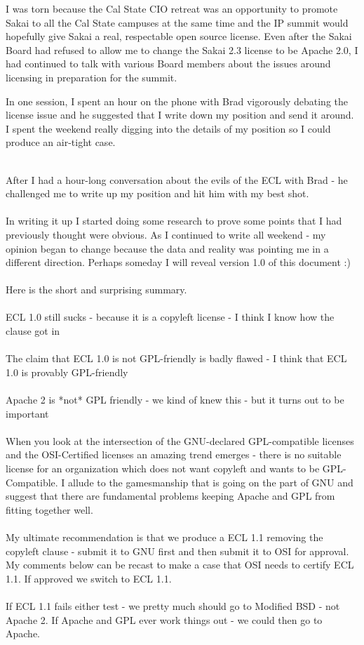 \documentclass[12pt]{book}
\begin{document}
I was torn because the Cal State CIO retreat was an opportunity
to promote Sakai to all the Cal State campuses at the same
time and the IP summit would hopefully give Sakai a real,
respectable open source license.  Even after the Sakai
Board had refused to allow me to change the Sakai 2.3
license to be Apache 2.0, I had continued to talk with
various Board members about the issues around licensing
in preparation for the summit.

In one session, I spent an hour on the phone
with Brad vigorously debating the license issue
and he suggested that I write down my position and
send it around.  I spent the weekend really digging
into the details of my position so I could
produce an air-tight case.\\
\\
\begin{sf}
After I had a hour-long conversation about the evils
of the ECL with Brad - he challenged me to write up
my position and hit him with my best shot.\\
\\
In writing it up I started doing some research to
prove some points that I had previously thought were
obvious.  As I continued to write all weekend - my opinion
began to change because the data and reality was pointing me
in a different direction.  Perhaps someday I will reveal
version 1.0 of this document :)\\
\\
Here is the short and surprising summary.\\
\\
ECL 1.0 still sucks - because it is a copyleft license -
I think I know how the clause got in\\
\\
The claim that ECL 1.0 is not GPL-friendly is badly
flawed - I think that ECL 1.0 is provably GPL-friendly\\
\\
Apache 2 is *not* GPL friendly - we kind of knew this -
but it turns out to be important\\
\\
When you look at the intersection of the GNU-declared
GPL-compatible licenses and the OSI-Certified licenses
an amazing trend emerges - there is no suitable license
for an organization which does not want copyleft and
wants to be GPL-Compatible.  I allude to the gamesmanship
that is going on the part of GNU and suggest that
there are fundamental problems keeping Apache and GPL
from fitting together well.\\
\\
My ultimate recommendation is that we produce a ECL 1.1
removing the copyleft clause - submit it to GNU first
and then submit it to OSI for approval.  My comments
below can be recast to make a case that OSI needs to
certify ECL 1.1.  If approved we switch to ECL 1.1.\\
\\
If ECL 1.1 fails either test - we pretty much should
go to Modified BSD - not Apache 2.  If Apache and GPL
ever work things out - we could then go to Apache.\\
\end{sf}
\end{document}
